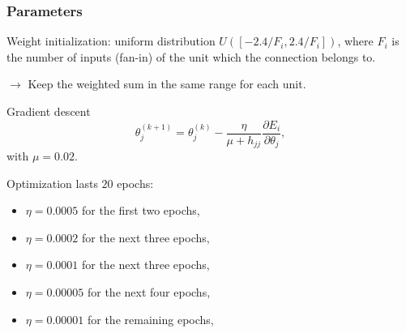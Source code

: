 \begin{frame}
	\frametitle{Parameters}
	
	Weight initialization: uniform distribution $U([-2.4/F_i, 2.4/F_i])$, where $F_i$ is the number of inputs (fan-in) of the unit which the connection belongs to. 
	
	\smallskip
	
	$\rightarrow$ Keep the weighted sum in the same range for each unit. 
	
	\bigskip
	
	
	\begin{block}{Gradient descent}
	$$
	\theta^{(k+1)}_j = \theta^{(k)}_j - \frac{\eta}{\mu + h_{jj}} \frac{\partial E_i}{\partial \theta_j},
	$$
	with $\mu = 0.02$. 
	\end{block}


	\bigskip

	Optimization lasts 	$20$ epochs: 
	\begin{itemize}
		\item $\eta = 0.0005$ for the first two epochs,
		\item $\eta = 0.0002$ for the next three epochs,
		\item $\eta = 0.0001$ for the next three epochs,
		\item $\eta = 0.00005$ for the next four epochs,
		\item $\eta = 0.00001$ for the remaining epochs,
	\end{itemize}
	
	
	

	
	
	
\end{frame}




